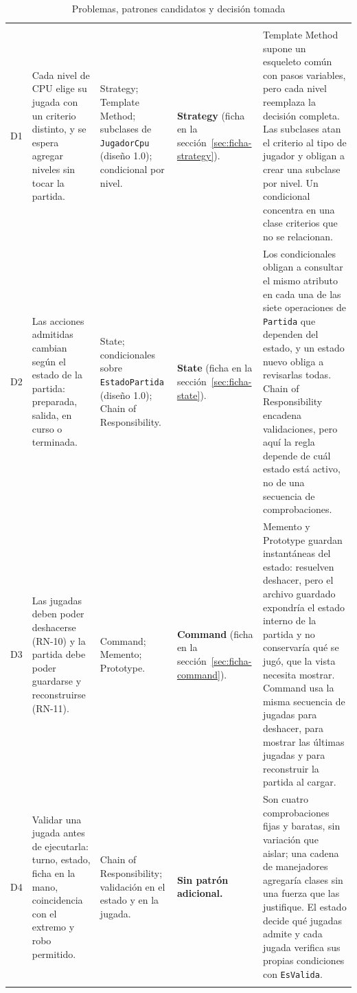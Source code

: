 {\tablacompacta
\begin{longtable}{@{}C{0.6cm}L{3.3cm}L{2.7cm}L{2.2cm}L{5.7cm}@{}}
  \caption{Problemas, patrones candidatos y decisión tomada}\label{tab:decision}\\
  \toprule
   &  &  &  &  \\ \midrule \endfirsthead
  \toprule
   &  &  &  &  \\ \midrule \endhead
  \bottomrule \endlastfoot
  D1 & Cada nivel de CPU elige su jugada con un criterio distinto, y se espera agregar niveles sin tocar la partida. & Strategy; Template Method; subclases de \texttt{JugadorCpu} (diseño 1.0); condicional por nivel. & \textbf{Strategy} (ficha en la sección~\ref{sec:ficha-strategy}). & Template Method supone un esqueleto común con pasos variables, pero cada nivel reemplaza la decisión completa. Las subclases atan el criterio al tipo de jugador y obligan a crear una subclase por nivel. Un condicional concentra en una clase criterios que no se relacionan. \\ \filasep
  D2 & Las acciones admitidas cambian según el estado de la partida: preparada, salida, en curso o terminada. & State; condicionales sobre \texttt{EstadoPartida} (diseño 1.0); Chain of Responsibility. & \textbf{State} (ficha en la sección~\ref{sec:ficha-state}). & Los condicionales obligan a consultar el mismo atributo en cada una de las siete operaciones de \texttt{Partida} que dependen del estado, y un estado nuevo obliga a revisarlas todas. Chain of Responsibility encadena validaciones, pero aquí la regla depende de cuál estado está activo, no de una secuencia de comprobaciones. \\ \filasep
  D3 & Las jugadas deben poder deshacerse (RN-10) y la partida debe poder guardarse y reconstruirse (RN-11). & Command; Memento; Prototype. & \textbf{Command} (ficha en la sección~\ref{sec:ficha-command}). & Memento y Prototype guardan instantáneas del estado: resuelven deshacer, pero el archivo guardado expondría el estado interno de la partida y no conservaría qué se jugó, que la vista necesita mostrar. Command usa la misma secuencia de jugadas para deshacer, para mostrar las últimas jugadas y para reconstruir la partida al cargar. \\ \filasep
  D4 & Validar una jugada antes de ejecutarla: turno, estado, ficha en la mano, coincidencia con el extremo y robo permitido. & Chain of Responsibility; validación en el estado y en la jugada. & \textbf{Sin patrón adicional.} & Son cuatro comprobaciones fijas y baratas, sin variación que aislar; una cadena de manejadores agregaría clases sin una fuerza que las justifique. El estado decide qué jugadas admite y cada jugada verifica sus propias condiciones con \texttt{EsValida}. \\ \filasep

\end{longtable}}
